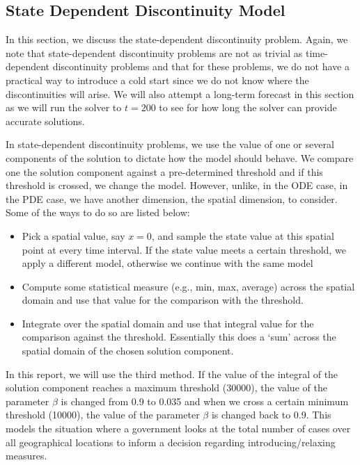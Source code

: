 \documentclass{article}
\begin{document}
\subsection{State Dependent Discontinuity Model}
\label{subsection:pde_state_intro}
In this section, we discuss the state-dependent discontinuity problem. Again, we note that state-dependent discontinuity problems are not as trivial as time-dependent discontinuity problems and that for these problems, we do not have a practical way to introduce a cold start since we do not know where the discontinuities will arise. We will also attempt a long-term forecast in this section as we will run the solver to $t=200$ to see for how long the solver can provide accurate solutions.

In state-dependent discontinuity problems, we use the value of one or several components of the solution to dictate how the model should behave. We compare one the solution component against a pre-determined threshold and if this threshold is crossed, we change the model. However, unlike, in the ODE case, in the PDE case, we have another dimension, the spatial dimension, to consider. Some of the ways to do so are listed below:
\begin{itemize}
\item Pick a spatial value, say $x=0$, and sample the state value at this spatial point at every time interval. If the state value meets a certain threshold, we apply a different model, otherwise we continue with the same model

\item Compute some statistical measure (e.g., min, max, average) across the spatial domain and use that value for the comparison with the threshold.

\item Integrate over the spatial domain and use that integral value for the comparison against the threshold. Essentially this does a `sum' across the spatial domain of the chosen solution component.
\end{itemize}

In this report, we will use the third method. If the value of the integral of the solution component reaches a maximum threshold (30000), the value of the parameter $\beta$ is changed from 0.9 to 0.035 and when we cross a certain minimum threshold (10000), the value of the parameter $\beta$ is changed back to 0.9. This models the situation where a government looks at the total number of cases over all geographical locations to inform a decision regarding introducing/relaxing measures.
\end{document}
